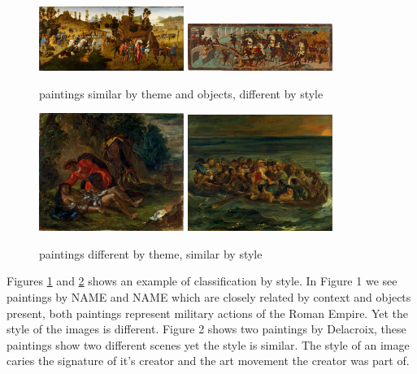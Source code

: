 \documentclass[a4paper]{article}
\begin{document}
\begin{figure}
\centering
\includegraphics[width=0.42\textwidth]{diff_caesar}
\includegraphics[width=0.42\textwidth]{diff_horatius}
\caption{paintings similar by theme and objects, different by style}
\label{diff}
\end{figure}

\begin{figure}
\centering
\includegraphics[width=0.42\textwidth]{sim_delacroix_samaritan}
\includegraphics[width=0.42\textwidth]{sim_delacroix_shipwreck}
\caption{paintings different by theme, similar by style}
\label{similar}
\end{figure}

Figures \ref{diff} and \ref{similar} shows an example of classification by
style.  In Figure 1 we see paintings by NAME and NAME which are closely related
by context and objects present, both paintings represent military actions of
the Roman Empire.  Yet the style of the images is different.  Figure 2 shows
two paintings by Delacroix, these paintings show two different scenes yet the
style is similar.  The style of an image caries the signature of it's creator
and the art movement the creator was part of.
\end{document}
